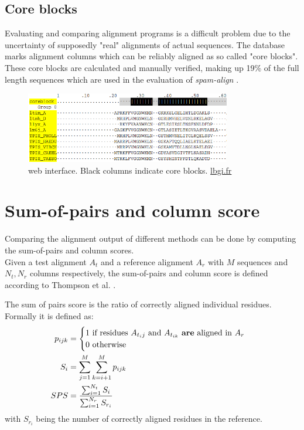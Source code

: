 \subsection{Core blocks}

Evaluating and comparing alignment programs is a difficult problem due to the uncertainty of supposedly "real" alignments of actual sequences. The \bb database  marks alignment columns which can be reliably aligned as so called "core blocks". These core blocks are calculated and manually verified, making up 19\% of the full length sequences which are used in the evaluation of \textit{spam-align} \cite{thompson2005balibase}.


\begin{figure}[h]
	\centering
	\includegraphics[width=0.8\textwidth]{./images/balibase-web.png}
	\caption{\bb web interface. Black columns indicate core blocks. \href{www.lbgi.fr/wscoperr?Balibase&FileMoi&macsimHtml&BB20006}{lbgi.fr}}
	\label{}
\end{figure}


\section{Sum-of-pairs and column score}
Comparing the alignment output of different methods can be done by computing the sum-of-pairs and column scores.\\
Given a test alignment $A_t$ and a reference alignment $A_r$ with $M$ sequences and $N_t, N_r$ columns respectively, the sum-of-pairs and column score is defined according to Thompson et al. \cite{thompson1999comprehensive}.

\begin{mydef}
	The sum of pairs score is the ratio of correctly aligned individual residues. Formally it is defined as:
	\begin{align*}
		p_{ijk} &= \begin{cases}
		1 \text{ if residues $A_{t{_ij}}$ and $A_{t_{ik}}$ \textbf{are} aligned in $A_r$}\\
		0 \text{ otherwise}
		\end{cases} \\
		S_i &= \sum_{j=1}^{M} \sum_{k=i+1}^{M} p_{ijk} \\
		SPS &= \frac{\sum_{i=1}^{N_t} S_i} {\sum_{i=1}^{N_r} S_{r_i}}
 	\end{align*}
 	with $S_{r_i}$ being the number of correctly aligned residues in the reference.
\end{mydef}

